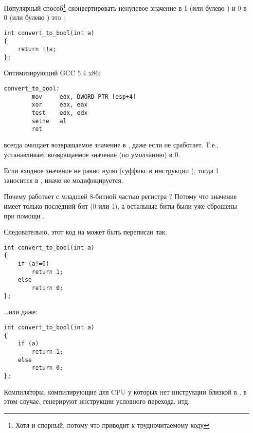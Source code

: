 
Популярный способ\footnote{Хотя и спорный, потому что приводит к трудночитаемому коду} сконвертировать ненулевое значение
в 1 (или булево ) и 0 в 0 (или булево ) это :

\begin{lstlisting}[style=customc]
int convert_to_bool(int a)
{
	return !!a;
};
\end{lstlisting}

Оптимизирующий GCC 5.4 x86:

\begin{lstlisting}[style=customasmx86]
convert_to_bool:
        mov     edx, DWORD PTR [esp+4]
        xor     eax, eax
        test    edx, edx
        setne   al
        ret
\end{lstlisting}

 всегда очищает возвращаемое значение в \EAX, даже если  не сработает.
Т.е.,  устанавливает возвращаемое значение (по умолчанию) в 0.

Если входное значение не равно нулю (суффикс  в инструкции ),
тогда 1 заносится в \AL, иначе \AL не модифицируется.

Почему  работает с младшей 8-битной частью регистра \EAX{}?
Потому что значение имеет только последний бит (0 или 1), а остальные биты были уже сброшены при помощи .

Следовательно, этот код на \CCpp может быть переписан так:

\begin{lstlisting}[style=customc]
int convert_to_bool(int a)
{
	if (a!=0)
		return 1;
	else
		return 0;
};
\end{lstlisting}

\dots или даже:

\begin{lstlisting}[style=customc]
int convert_to_bool(int a)
{
	if (a)
		return 1;
	else
		return 0;
};
\end{lstlisting}

Компиляторы, компилирующие для \ac{CPU} у которых нет инструкции близкой в
, в этом случае, генерируют инструкции условного перехода, итд.

